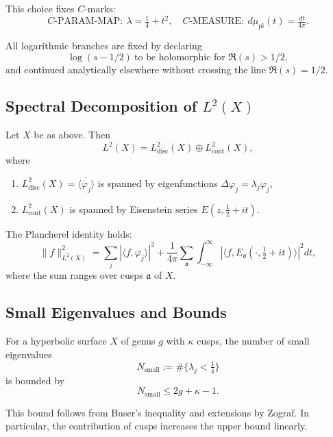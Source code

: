 This choice fixes $C\text{-marks}$:
\[
C\text{-PARAM-MAP}:\ \lambda = \tfrac{1}{4}+t^2, 
\quad
C\text{-MEASURE}:\ d\mu_{\mathrm{pl}}(t) = \tfrac{dt}{4\pi}.
\]

\begin{remark}
\label{rem:branch-choice}
All logarithmic branches are fixed by declaring
\[
\log(s-1/2) \ \text{to be holomorphic for } \Re(s) > 1/2, 
\]
and continued analytically elsewhere without crossing the line $\Re(s)=1/2$.
\end{remark}

\subsection{Spectral Decomposition of $L^2(X)$}

\begin{theorem}
\label{thm:spectral-decomp}
Let $X$ be as above. Then
\[
L^2(X) = L^2_{\mathrm{disc}}(X) \oplus L^2_{\mathrm{cont}}(X),
\]
where
\begin{enumerate}
  \item $L^2_{\mathrm{disc}}(X) = \overline{\langle \varphi_j \rangle}$ is spanned by eigenfunctions $\Delta \varphi_j = \lambda_j \varphi_j$,
  \item $L^2_{\mathrm{cont}}(X)$ is spanned by Eisenstein series $E(z, \tfrac{1}{2} + it)$.
\end{enumerate}
The Plancherel identity holds:
\[
\|f\|^2_{L^2(X)} = \sum_{j} |\langle f, \varphi_j \rangle|^2 + \frac{1}{4\pi}\sum_{\mathfrak{a}} \int_{-\infty}^\infty \left| \langle f, E_{\mathfrak{a}}(\cdot,\tfrac{1}{2}+it) \rangle \right|^2 dt,
\]
where the sum ranges over cusps $\mathfrak{a}$ of $X$.
\end{theorem}

\subsection{Small Eigenvalues and Bounds}

\begin{proposition}
\label{prop:small-eigenvalues}
For a hyperbolic surface $X$ of genus $g$ with $\kappa$ cusps, the number of small eigenvalues
\[
N_{\mathrm{small}} := \#\{\lambda_j < \tfrac{1}{4}\}
\]
is bounded by
\[
N_{\mathrm{small}} \leq 2g + \kappa - 1.
\]
\end{proposition}

\begin{remark}
This bound follows from Buser’s inequality and extensions by Zograf. In particular, the contribution of cusps increases the upper bound linearly.
\end{remark}

